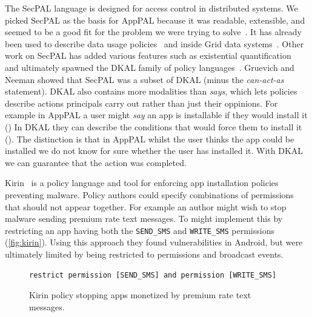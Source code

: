 \documentclass[]{llncs}
\begin{document}
The SecPAL language is designed for access control in distributed systems.
We picked SecPAL as the basis for AppPAL because it was readable, extensible, and seemed to be a good fit for the problem we were trying to solve~\cite{Hallett:2014un}.
It has already been used to describe data usage policies~\cite{Aziz:2011vt} and inside Grid data systems~\cite{Humphrey:2007wc}.
Other work on SecPAL has added various features such as existential quantification~\cite{Becker:2009vt} and ultimately spawned the DKAL family of policy languages~\cite{Gurevich:2008fz,Gurevich:Qo5E3M3}.
Gruevich and Neeman showed that SecPAL was a subset of DKAL (minus the \emph{can-act-as} statement).
DKAL also contains more modalities than \emph{says}, which lets policies describe actions principals carry out rather than just their oppinions.
For example in AppPAL a user might \emph{say} an app is installable if they would install it ()
In DKAL they can describe the conditions that would force them to install it ().
The distinction is that in AppPAL whilst the user thinks the app could be installed we do not know for sure whether the user has installed it.
With DKAL we can guarantee that the action was completed.

Kirin~\cite{Enck:2009ko} is a policy language and tool for enforcing app installation policies preventing malware.
Policy authors could specify combinations of permissions that should not appear together.
For example an author might wish to stop malware sending premium rate text messages.
To might implement this by restricting an app having both the \texttt{SEND\_SMS} and \texttt{WRITE\_SMS} permissions (\autoref{fig:kirin}).
Using this approach they found vulnerabilities in Android, but were ultimately limited by being restricted to permissions and broadcast events.
\begin{figure}
\begin{lstlisting}
restrict permission [SEND_SMS] and permission [WRITE_SMS]
\end{lstlisting}
\caption{Kirin policy stopping apps monetized by premium rate text messages.}
\label{fig:kirin}
\end{figure}
\end{document}
